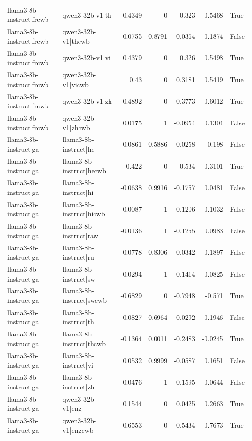 \begin{table}
\begin{tabular}{l l r r r r l}
llama3-8b-instruct|frcwb & qwen3-32b-v1|th & 0.4349 & 0 & 0.323 & 0.5468 & True \\
llama3-8b-instruct|frcwb & qwen3-32b-v1|thcwb & 0.0755 & 0.8791 & -0.0364 & 0.1874 & False \\
llama3-8b-instruct|frcwb & qwen3-32b-v1|vi & 0.4379 & 0 & 0.326 & 0.5498 & True \\
llama3-8b-instruct|frcwb & qwen3-32b-v1|vicwb & 0.43 & 0 & 0.3181 & 0.5419 & True \\
llama3-8b-instruct|frcwb & qwen3-32b-v1|zh & 0.4892 & 0 & 0.3773 & 0.6012 & True \\
llama3-8b-instruct|frcwb & qwen3-32b-v1|zhcwb & 0.0175 & 1 & -0.0954 & 0.1304 & False \\
llama3-8b-instruct|ga & llama3-8b-instruct|he & 0.0861 & 0.5886 & -0.0258 & 0.198 & False \\
llama3-8b-instruct|ga & llama3-8b-instruct|hecwb & -0.422 & 0 & -0.534 & -0.3101 & True \\
llama3-8b-instruct|ga & llama3-8b-instruct|hi & -0.0638 & 0.9916 & -0.1757 & 0.0481 & False \\
llama3-8b-instruct|ga & llama3-8b-instruct|hicwb & -0.0087 & 1 & -0.1206 & 0.1032 & False \\
llama3-8b-instruct|ga & llama3-8b-instruct|raw & -0.0136 & 1 & -0.1255 & 0.0983 & False \\
llama3-8b-instruct|ga & llama3-8b-instruct|ru & 0.0778 & 0.8306 & -0.0342 & 0.1897 & False \\
llama3-8b-instruct|ga & llama3-8b-instruct|sw & -0.0294 & 1 & -0.1414 & 0.0825 & False \\
llama3-8b-instruct|ga & llama3-8b-instruct|swcwb & -0.6829 & 0 & -0.7948 & -0.571 & True \\
llama3-8b-instruct|ga & llama3-8b-instruct|th & 0.0827 & 0.6964 & -0.0292 & 0.1946 & False \\
llama3-8b-instruct|ga & llama3-8b-instruct|thcwb & -0.1364 & 0.0011 & -0.2483 & -0.0245 & True \\
llama3-8b-instruct|ga & llama3-8b-instruct|vi & 0.0532 & 0.9999 & -0.0587 & 0.1651 & False \\
llama3-8b-instruct|ga & llama3-8b-instruct|zh & -0.0476 & 1 & -0.1595 & 0.0644 & False \\
llama3-8b-instruct|ga & qwen3-32b-v1|eng & 0.1544 & 0 & 0.0425 & 0.2663 & True \\
llama3-8b-instruct|ga & qwen3-32b-v1|engcwb & 0.6553 & 0 & 0.5434 & 0.7673 & True \\

\end{tabular}
\end{table}
